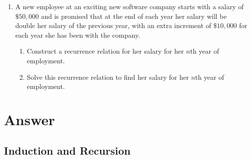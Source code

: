 \documentclass{../../cls/sig-alternate-05-2015}
\begin{document}
\begin{enumerate}
\item A new employee at an exciting new software company
starts with a salary of $\$50,000$ and is promised that at the
end of each year her salary will be double her salary of
the previous year, with an extra increment of $\$10,000$ for
each year she has been with the company.
\begin{enumerate}
    \item Construct a recurrence relation for her salary for her
    $n$th year of employment.
    \item Solve this recurrence relation to find her salary for her
    $n$th year of employment.
\end{enumerate}






\end{enumerate}

\nocite{*}

 
\clearpage
\appendix
\section{Answer}
\subsection{Induction and Recursion}
\end{document}

